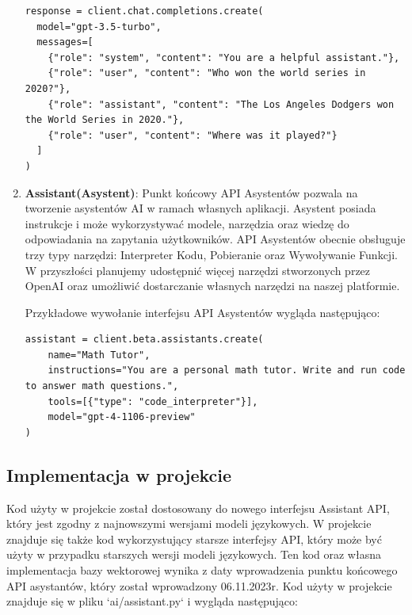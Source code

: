\begin{enumerate}
\begin{listing}
\begin{verbatim}
response = client.chat.completions.create(
  model="gpt-3.5-turbo",
  messages=[
    {"role": "system", "content": "You are a helpful assistant."},
    {"role": "user", "content": "Who won the world series in 2020?"},
    {"role": "assistant", "content": "The Los Angeles Dodgers won the World Series in 2020."},
    {"role": "user", "content": "Where was it played?"}
  ]
)
            \end{verbatim}
        \end{listing}
        \item \textbf{Assistant(Asystent)}: Punkt końcowy API Asystentów pozwala na tworzenie asystentów AI w ramach własnych aplikacji. Asystent posiada instrukcje i może wykorzystywać modele, narzędzia oraz wiedzę do odpowiadania na zapytania użytkowników. API Asystentów obecnie obsługuje trzy typy narzędzi: Interpreter Kodu, Pobieranie oraz Wywoływanie Funkcji. W przyszłości planujemy udostępnić więcej narzędzi stworzonych przez OpenAI oraz umożliwić dostarczanie własnych narzędzi na naszej platformie.
        
        Przykładowe wywołanie interfejsu API Asystentów wygląda następująco:
        \begin{listing}
            \begin{verbatim}
assistant = client.beta.assistants.create(
    name="Math Tutor",
    instructions="You are a personal math tutor. Write and run code to answer math questions.",
    tools=[{"type": "code_interpreter"}],
    model="gpt-4-1106-preview"
)
            \end{verbatim}
        \end{listing}
\end{enumerate}

\subsection{Implementacja w projekcie}
Kod użyty w projekcie został dostosowany do nowego interfejsu Assistant API, który jest zgodny z najnowszymi wersjami modeli językowych. W projekcie znajduje się także kod wykorzystujący starsze interfejsy API, który może być użyty w przypadku starszych wersji modeli językowych. Ten kod oraz własna implementacja bazy wektorowej wynika z daty wprowadzenia punktu końcowego API asystantów, który został wprowadzony 06.11.2023r.
Kod użyty w projekcie znajduje się w pliku `ai/assistant.py` i wygląda następująco:

